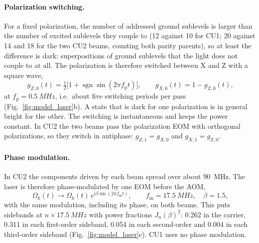 \documentclass[11pt,a4paper,oneside]{report}
\begin{document}
\paragraph{Polarization switching.} For a fixed polarization, the number of addressed ground
sublevels is larger than the number of excited sublevels they couple to (12 against 10 for CU1; 20
against 14 and 18 for the two CU2 beams, counting both parity parents), so at least the difference is
dark: superpositions of ground
sublevels that the light does not couple to at all. The polarization is therefore switched between X
and Z with a square wave,
\begin{equation}
  g_{Z,0}(t)=\tfrac12\bigl[1+\operatorname{sgn}\sin(2\pi f_{\mathrm p}t)\bigr],\qquad
  g_{X,0}(t)=1-g_{Z,0}(t),
\end{equation}
at $f_{\mathrm p}=\SI{0.5}{MHz}$, i.e.\ about five switching periods per pass
(Fig.~\ref{fig:model_laser}b). A state that is dark for one polarization is in general bright for the
other. The switching is instantaneous and keeps the power constant. In CU2 the two beams pass the
polarization EOM with orthogonal polarizations, so they switch in antiphase:
$g_{Z,1}=g_{X,0}$ and $g_{X,1}=g_{Z,0}$.

\paragraph{Phase modulation.} In CU2 the components driven by each beam spread over about
\SI{90}{MHz}. The laser is therefore phase-modulated by one EOM before the AOM,
\begin{equation}
  \Omega_k(t)\to\Omega_k(t)\,e^{\mathrm i\beta\sin(2\pi f_{\mathrm m}t)},\qquad
  f_{\mathrm m}=\SI{17.5}{MHz},\quad\beta=1.5,
\end{equation}
with the same modulation, including its phase, on both beams. This puts sidebands at
$n\times\SI{17.5}{MHz}$ with power fractions $J_n(\beta)^2$: 0.262 in the carrier, 0.311 in each
first-order sideband, 0.054 in each second-order and 0.004 in each third-order sideband
(Fig.~\ref{fig:model_laser}c). CU1 uses no phase modulation.
\end{document}
